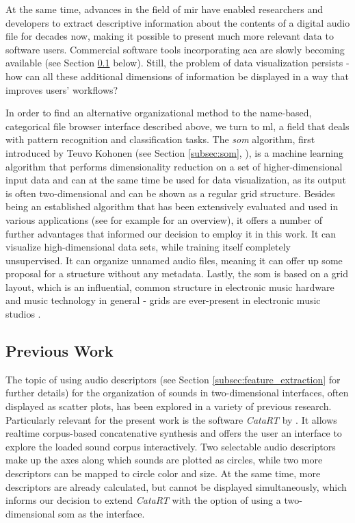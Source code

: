 At the same time, advances in the field of \gls{mir} have enabled researchers
and developers to extract descriptive information about the contents
of a digital audio file for decades now, making it possible to present much
more relevant data to software users. Commercial software tools incorporating
\gls{aca} are slowly becoming available (see Section \ref{subsec:previous_work}
below). Still, the problem of data visualization persists - how can all these
additional dimensions of information be displayed in a way that improves users'
workflows?

\smallskip

In order to find an alternative organizational method to the name-based,
categorical file browser interface described above, we turn to \gls{ml},
a field that deals with pattern recognition and classification tasks. The
\textit{\gls{som}} algorithm, first introduced by Teuvo Kohonen (see Section
\ref{subsec:som}, \citet{kohonen1990}), is a machine learning algorithm that
performs dimensionality reduction on a set of higher-dimensional input data and
can at the same time be used for data visualization, as its output is often
two-dimensional and can be shown as a regular grid structure. Besides being an
established algorithm that has been extensively evaluated and used in various
applications (see for example \citet[p.1476]{kohonen1990} for an overview), it
offers a number of further advantages that informed our decision to employ it
in this work. It can visualize high-dimensional data sets, while training itself
completely unsupervised. It can organize unnamed audio files, meaning it can
offer up some proposal for a structure without any metadata. Lastly, the
\gls{som} is based on a grid layout, which is an influential, common structure
in electronic music hardware and music technology in general - grids are
ever-present in electronic music studios \citep{adeney2009}.

\subsection{Previous Work}
\label{subsec:previous_work}
The topic of using audio descriptors (see Section
\ref{subsec:feature_extraction} for further details) for the organization of
sounds in two-dimensional interfaces, often displayed as scatter plots, has been
explored in a variety of previous research. Particularly relevant for the
present work is the software \textit{CataRT} by \citet{schwarz2006}. It allows
realtime corpus-based concatenative synthesis and offers the user an interface
to explore the loaded sound corpus interactively. Two selectable audio
descriptors make up the axes along which sounds are plotted as circles, while
two more descriptors can be mapped to circle color and size. At the same time,
more descriptors are already calculated, but cannot be displayed simultaneously,
which informs our decision to extend \textit{CataRT} with the option of using a
two-dimensional \gls{som} as the interface.

